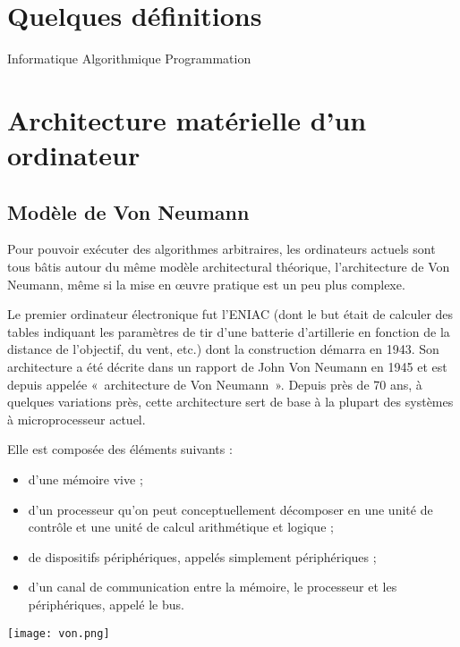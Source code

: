 \section{Quelques définitions}
Informatique
Algorithmique
Programmation

\section{Architecture matérielle d'un ordinateur}
\subsection{Modèle de Von Neumann}

Pour pouvoir exécuter des algorithmes arbitraires, les ordinateurs actuels sont tous bâtis
autour du même modèle architectural théorique, l’architecture de Von Neumann, même
si la mise en œuvre pratique est un peu plus complexe.

Le premier ordinateur électronique fut l’ENIAC
(dont le but était de calculer des tables indiquant les paramètres de tir d’une batterie d’artillerie
en fonction de la distance de l’objectif, du vent, etc.) dont la construction démarra
en 1943. 
Son architecture a été décrite dans un rapport de John Von Neumann en 1945 et
est depuis appelée «~architecture de Von Neumann~». Depuis près de 70 ans, à quelques variations
près, cette  architecture sert de base à la plupart des systèmes à microprocesseur actuel. 

\begin{minipage}[c]{.49\linewidth}
Elle est composée des éléments suivants :
\begin{itemize}
\item d'une mémoire vive ;
\item d'un processeur qu'on peut conceptuellement décomposer en une unité de contrôle et
une unité de calcul arithmétique et logique ;
\item de dispositifs périphériques, appelés simplement périphériques ;
\item d'un canal de communication entre la mémoire, le processeur et les périphériques, appelé
le bus.
\end{itemize}
\end{minipage} \hfill
\begin{minipage}[c]{.49\linewidth}
\begin{center}
\texttt{[image: von.png]}
\end{center}
\end{minipage}

